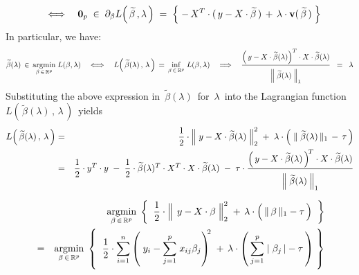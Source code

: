 \begin{lemma}
\begin{enumerate}
\begin{equation*}
	\quad\Longleftrightarrow\quad
	\mathbf{0}_{p}
	\; \in \;
		\partial_{\beta} L\!\left(\,\widetilde{\beta}\,,\lambda\,\right)
	\; = \;
		\left\{\;
			- \, X^{T} \cdot (\,y - X \cdot \widetilde{\beta}\,)
			\, \overset{{\color{white}.}}{+} \,
			\lambda\cdot\mathbf{v}(\,\widetilde{\beta}\,)
			\;\right\}
	\end{equation*}
	\vskip 0.2cm
	In particular, we have:
	\begin{equation*}
	\widetilde{\beta}(\lambda)\,\in\,\underset{\beta\,\in\,\Re^{p}}{\argmin}\;L(\beta,\lambda)
	\quad\Longleftrightarrow\quad
		L\!\left(\,\widetilde{\beta}(\lambda)\,,\,\lambda\,\right)
		\,=\,
		\underset{\beta\,\in\,\Re^{p}}{\inf}\;L(\beta,\lambda)
	\quad\Longrightarrow\quad
		\dfrac{
			\left(\,y - X\cdot\widetilde{\beta}(\lambda)\right)^{T} \cdot X \cdot \widetilde{\beta}(\lambda)
			}{
			\overset{{\color{white}.}}{\left\Vert\;\widetilde{\beta}(\lambda)\;\right\Vert_{1}}
			}
		\;\; = \;\;
			\lambda
	\end{equation*}
	Substituting the above expression in
	\,$\widetilde{\beta}(\lambda)$\, for \,$\lambda$\,
	into the Lagrangian function
	\,$L\!\left(\,\widetilde{\beta}(\lambda)\,,\,\lambda\,\right)$\,
	yields
	\begin{eqnarray*}
	L\!\left(\,\widetilde{\beta}(\lambda)\,,\,\lambda\,\right)
	& = &
		\dfrac{1}{2}\cdot
		\left\Vert\;y - X\cdot\widetilde{\beta}(\lambda)\;\right\Vert^{2}_{2}
		\; + \;
		\lambda\cdot
		\left(\;\Vert\;\widetilde{\beta}(\lambda)\,\Vert_{1} \,-\, \tau\,\right)
	\\
	& = &
		\dfrac{1}{2} \cdot y^{T} \cdot y
		\; - \;
		\overset{{\color{white}1}}{\dfrac{1}{2}}
		\cdot
		\widetilde{\beta}(\lambda)^{T} \cdot X^{T} \cdot X \cdot \widetilde{\beta}(\lambda)
		\; - \;
		\tau\cdot
		\dfrac{
			\left(\, y - X\cdot\widetilde{\beta}(\lambda)\,\right)^{\!T} \cdot X \cdot \widetilde{\beta}(\lambda)
			}{
			\overset{{\color{white}.}}{\left\Vert\;\widetilde{\beta}(\lambda)\;\right\Vert_{1}}
			}
	\end{eqnarray*}
\end{enumerate}
\begin{eqnarray*}
&&
	\underset{\beta\,\in\,\Re^{p}}{\argmin}\;
	\left\{\;\;
		\dfrac{1}{2}
		\cdot
		\left\Vert\;\, y \overset{{\color{white}.}}{-} X\cdot\beta \;\right\Vert_{2}^{2}
		\; + \,
		\lambda\cdot\left(\,\Vert\,\beta\,\Vert_{1} \overset{{\color{white}.}}{-} \tau\,\right)
		\;\;\right\}
\\
& = &
	\underset{\beta\,\in\,\Re^{p}}{\argmin}\;
	\left\{\;\;
		\dfrac{1}{2}
		\cdot
		\overset{n}{\underset{i=1}{\sum}}
		\left(\; y_{i} - \overset{p}{\underset{j=1}{\sum}}\;x_{ij}\beta_{j}\right)^{\!\!2}
		\; + \,
		\lambda\cdot
		\left(\,
			\overset{p}{\underset{j=1}{\sum}}\;\vert\;\beta_{j}\,\vert - \tau
			\,\right)
		\;\right\}
\end{eqnarray*}
\end{lemma}

